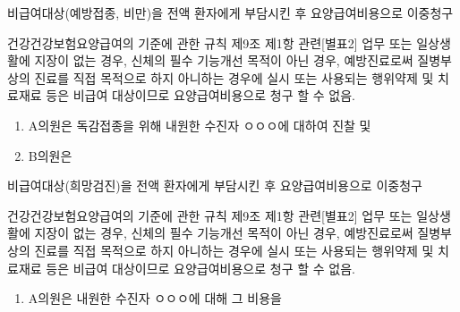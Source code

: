 비급여대상(예방접종, 비만)을 전액 환자에게 부담시킨 후 요양급여비용으로 이중청구
\begin{description}\tightlist
\item[관련근거] 건강건강보험요양급여의 기준에 관한 규칙 제9조 제1항 관련[별표2] 업무 또는 일상생활에 지장이 없는 경우, 신체의 필수 기능개선 목적이 아닌 경우, 예방진료로써 질병\cntrdot{}부상의 진료를 직접 목적으로 하지 아니하는 경우에 실시 또는 사용되는 행위\cntrdot{}약제 및 치료재료 등은 비급여 대상이므로 요양급여비용으로 청구 할 수 없음.
\item[부당사례]
\begin{enumerate}[1)]\tightlist
\item  A의원은 독감접종을 위해 내원한 수진자 ㅇㅇㅇ에 대하여 진찰 및 
\item B의원은 
\end{enumerate}
\end{description}

비급여대상(희망검진)을 전액 환자에게 부담시킨 후 요양급여비용으로 이중청구
\begin{description}\tightlist
\item[관련근거] 건강건강보험요양급여의 기준에 관한 규칙 제9조 제1항 관련[별표2] 업무 또는 일상생활에 지장이 없는 경우, 신체의 필수 기능개선 목적이 아닌 경우, 예방진료로써 질병\cntrdot{}부상의 진료를 직접 목적으로 하지 아니하는 경우에 실시 또는 사용되는 행위\cntrdot{}약제 및 치료재료 등은 비급여 대상이므로 요양급여비용으로 청구 할 수 없음.
\item[부당사례]
\begin{enumerate}[1)]\tightlist
\item  A의원은  내원한 수진자 ㅇㅇㅇ에 대해 그 비용을 
\end{enumerate}
\end{description}

